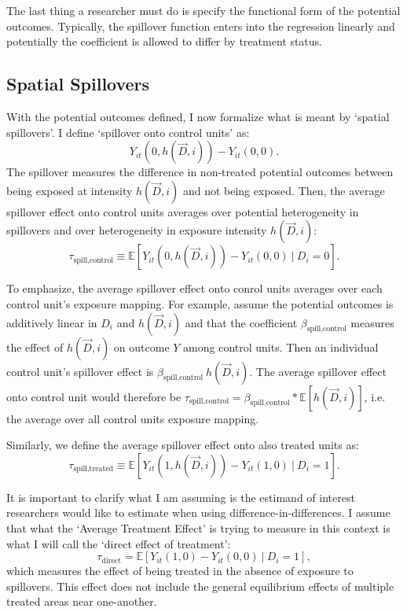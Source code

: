 \documentclass[11pt]{article}
\begin{document}
The last thing a researcher must do is specify the functional form of the potential outcomes. Typically, the spillover function enters into the regression linearly and potentially the coefficient is allowed to differ by treatment status. 



\subsection{Spatial Spillovers}

With the potential outcomes defined, I now formalize what is meant by `spatial spillovers'. I define `spillover onto control units' as: \[
    Y_{it}(0, h(\vec{D}, i)) - Y_{it}(0, 0).
\] 
The spillover measures the difference in non-treated potential outcomes between being exposed at intensity $h(\vec{D}, i)$ and not being exposed. Then, the average spillover effect onto control units averages over potential heterogeneity in spillovers and over heterogeneity in exposure intensity $h(\vec{D}, i)$: \[
    \tau_{\text{spill,control}} \equiv \mathbb{E} \left[ Y_{it}(0, h(\vec{D}, i)) - Y_{it}(0, 0) \ \vert \ D_i = 0 \right].
\]

To emphasize, the average spillover effect onto conrol units averages over each control unit's exposure mapping. For example, assume the potential outcomes is additively linear in $D_i$ and $h(\vec{D}, i)$ and that the coefficient $\beta_{\text{spill,control}}$ measures the effect of $h(\vec{D}, i)$ on outcome $Y$ among control units. Then an individual control unit's spillover effect is $\beta_{\text{spill,control}} \ h(\vec{D}, i)$. The average spillover effect onto control unit would therefore be $\tau_{\text{spill,control}} = \beta_{\text{spill,control}} * \mathbb{E} \left[ h(\vec{D}, i)\right]$, i.e. the average over all control units exposure mapping.

Similarly, we define the average spillover effect onto also treated units as: \[ 
    \tau_{\text{spill,treated}} \equiv \mathbb{E} \left[ Y_{it}(1, h(\vec{D}, i)) - Y_{it}(1, 0) \ \vert \ D_i = 1 \right].
\] 

It is important to clarify what I am assuming is the estimand of interest researchers would like to estimate when using difference-in-differences. I assume that what the `Average Treatment Effect' is trying to measure in this context is what I will call the `direct effect of treatment': \[
    \tau_{\text{direct}} = \mathbb{E} \left[ Y_{it}(1, 0) - Y_{it}(0, 0) \ \vert \ D_i = 1 \right],
\] 
which measures the effect of being treated in the absence of exposure to spillovers. This effect does not include the general equilibrium effects of multiple treated areas near one-another.
\end{document}
